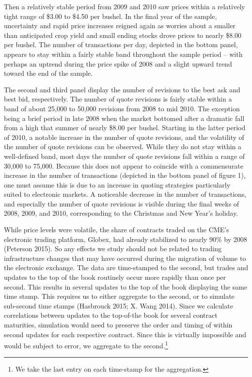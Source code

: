 \documentclass[review,12pt]{elsarticle}
\begin{document}
\begin{linenumbers}
Then a relatively stable period from 2009 and 2010 saw prices within a
relatively tight range of \$3.00 to \$4.50 per bushel. In the final year
of the sample, uncertainty and rapid price increases reigned again as
worries about a smaller than anticipated crop yield and small ending
stocks drove prices to nearly \$8.00 per bushel. The number of
transactions per day, depicted in the bottom panel, appears to stay
within a fairly stable band throughout the sample period -- with perhaps
an uptrend during the price spike of 2008 and a slight upward trend
toward the end of the sample.

The second and third panel display the number of revisions to the best
ask and best bid, respectively. The number of quote revisions is fairly
stable within a band of about 25,000 to 50,000 revisions from 2008 to
mid 2010. The exception being a brief period in late 2008 when the
market bottomed after a dramatic fall from a high that summer of nearly
\$8.00 per bushel. Starting in the latter period of 2010, a notable
increase in the number of quote revisions, and the volatility of the
number of quote revisions can be observed. While they do not stay within
a well-defined band, most days the number of quote revisions fall within
a range of 30,000 to 75,000. Because this does not appear to coincide
with a commensurate increase in the number of transactions (depicted in
the bottom panel of figure 1), one must assume this is due to an
increase in quoting strategies particularly suited to electronic
markets. A noticeable decrease in the number of transactions, and
especially the number of quote revisions is visible during the final
weeks of 2008, 2009, and 2010, corresponding to the Christmas and New
Year's holiday.

While price levels were volatile, the share of contracts traded on the
CME's electronic trading platform, Globex, had already stabilized to
nearly 90\% by 2008 (Peterson 2015). So any effects we study should not
be related to trading infrastructure changes that may have occurred
during the migration of volume to the electronic exchange. The data are
time-stamped to the second, but trades and updates to the top of the
book routinely occur more rapidly than once per second. This results in
several updates to the top of the book displaying the same time stamp.
This requires us to either aggregate to the second, or to simulate
sub-second time stamps (Hasbrouck 2015; X. Wang 2014). Since we
calculate correlations between updates to the top-of-the book for
several contract maturities, simulation would need to preserve the order
and timing of within second updates for each respective contract. Since
this is virtually impossible and would be subject to error, we aggregate
to the second.\footnote{We take the last entry on each time-stamp for
  the aggregation.}


\end{linenumbers}
\end{document}
